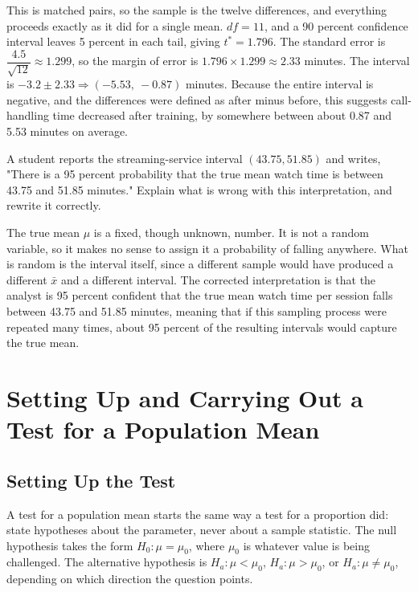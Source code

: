 \begin{Answer}[ref={ex:means-ci-paired}]
This is matched pairs, so the sample is the twelve differences, and everything proceeds exactly as it did for a single mean. $df = 11$, and a 90 percent confidence interval leaves 5 percent in each tail, giving $t^* = 1.796$. The standard error is $\dfrac{4.5}{\sqrt{12}} \approx 1.299$, so the margin of error is $1.796 \times 1.299 \approx 2.33$ minutes. The interval is $-3.2 \pm 2.33 \Rightarrow (-5.53,\ -0.87)$ minutes. Because the entire interval is negative, and the differences were defined as after minus before, this suggests call-handling time decreased after training, by somewhere between about 0.87 and 5.53 minutes on average.
\end{Answer}
 
\begin{Exercise}[title={Spot the Error}, label={ex:means-ci-interp-error}]
A student reports the streaming-service interval $(43.75, 51.85)$ and writes, "There is a 95 percent probability that the true mean watch time is between 43.75 and 51.85 minutes." Explain what is wrong with this interpretation, and rewrite it correctly.
\end{Exercise}
 
\begin{Answer}[ref={ex:means-ci-interp-error}]
The true mean $\mu$ is a fixed, though unknown, number. It is not a random variable, so it makes no sense to assign it a probability of falling anywhere. What is random is the interval itself, since a different sample would have produced a different $\bar{x}$ and a different interval. The corrected interpretation is that the analyst is 95 percent confident that the true mean watch time per session falls between 43.75 and 51.85 minutes, meaning that if this sampling process were repeated many times, about 95 percent of the resulting intervals would capture the true mean.
\end{Answer}
 
\section{Setting Up and Carrying Out a Test for a Population Mean}
 
\subsection{Setting Up the Test}
 
A test for a population mean starts the same way a test for a proportion did: state hypotheses about the parameter, never about a sample statistic. The null hypothesis takes the form $H_0: \mu = \mu_0$, where $\mu_0$ is whatever value is being challenged. The alternative hypothesis is $H_a: \mu < \mu_0$, $H_a: \mu > \mu_0$, or $H_a: \mu \neq \mu_0$, depending on which direction the question points.
 
